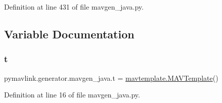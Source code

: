 Definition at line 431 of file mavgen\+\_\+java.\+py.



\subsection{Variable Documentation}
\mbox{\label{namespacepymavlink_1_1generator_1_1mavgen__java_a9811e8e58e02d015df7851ec8346e896}} 
\subsubsection{\texorpdfstring{t}{t}}
{\footnotesize\ttfamily pymavlink.\+generator.\+mavgen\+\_\+java.\+t = \mbox{\hyperlink{classpymavlink_1_1generator_1_1mavtemplate_1_1MAVTemplate}{mavtemplate.\+M\+A\+V\+Template}}()}



Definition at line 16 of file mavgen\+\_\+java.\+py.

